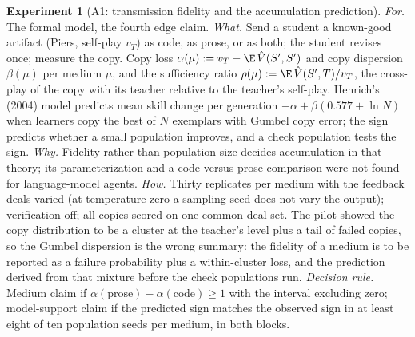 \documentclass[11pt]{article}
\numberwithin{theorem}{section}
\theoremstyle{definition}
\theoremstyle{problemstyle}
\newtheorem{experiment}{Experiment}[section]
\begin{document}
\begin{experiment}[A1: transmission fidelity and the accumulation prediction]
\emph{For.} The formal model, the fourth edge claim.
\emph{What.} Send a student a known-good artifact (Piers, self-play $v_T$) as code, as prose, or as both; the student
revises once; measure the copy. Copy loss $\alpha(\mu):=v_T-\E\,\hat V(S',S')$ and copy dispersion $\beta(\mu)$ per
medium $\mu$, and the sufficiency ratio $\rho(\mu):=\E\,\hat V(S',T)/v_T$, the cross-play of the copy with its
teacher relative to the teacher's self-play. Henrich's (2004) model predicts mean skill change per generation
$-\alpha+\beta(0.577+\ln N)$ when learners copy the best of $N$ exemplars with Gumbel copy error; the sign predicts
whether a small population improves, and a check population tests the sign.
\emph{Why.} Fidelity rather than population size decides accumulation in that theory; its parameterization and a
code-versus-prose comparison were not found for language-model agents.
\emph{How.} Thirty replicates per medium with the feedback deals varied (at temperature zero a sampling seed does not
vary the output); verification off; all copies scored on one common deal set. The pilot showed the copy distribution
to be a cluster at the teacher's level plus a tail of failed copies, so the Gumbel dispersion is the wrong summary: the
fidelity of a medium is to be reported as a failure probability plus a within-cluster loss, and the prediction derived
from that mixture before the check populations run.
\emph{Decision rule.} Medium claim if $\alpha(\text{prose})-\alpha(\text{code})\ge1$ with the interval excluding
zero; model-support claim if the predicted sign matches the observed sign in at least eight of ten population seeds
per medium, in both blocks.
\end{experiment}
\end{document}
